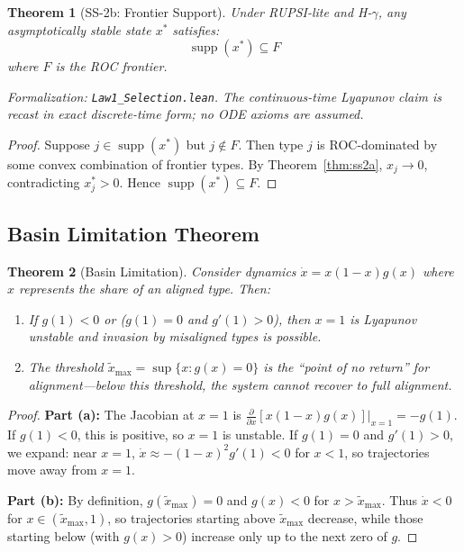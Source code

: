 \documentclass[12pt]{article}
\newtheorem{theorem}{Theorem}[section]
\DeclareMathOperator{\supp}{supp}
\begin{document}
\begin{theorem}[SS-2b: Frontier Support]
\label{thm:ss2b}
Under RUPSI-lite and H-$\gamma$, any asymptotically stable state $x^*$ satisfies:
\[
\supp(x^*) \subseteq F
\]
where $F$ is the ROC frontier.
\end{theorem}
\noindent\textit{Formalization: \texttt{Law1\_Selection.lean}. The continuous-time Lyapunov claim is recast in exact discrete-time form; no ODE axioms are assumed.}

\begin{proof}
Suppose $j \in \supp(x^*)$ but $j \notin F$. Then type $j$ is ROC-dominated by some convex combination of frontier types. By Theorem~\ref{thm:ss2a}, $x_j \to 0$, contradicting $x^*_j > 0$. Hence $\supp(x^*) \subseteq F$.
\end{proof}

\subsection{Basin Limitation Theorem}

\begin{theorem}[Basin Limitation]
\label{thm:basin}
Consider dynamics $\dot{x} = x(1-x)g(x)$ where $x$ represents the share of an aligned type. Then:
\begin{enumerate}
    \item[(a)] If $g(1) < 0$ or ($g(1) = 0$ and $g'(1) > 0$), then $x = 1$ is Lyapunov unstable and invasion by misaligned types is possible.
    
    \item[(b)] The threshold $\tilde{x}_{\max} = \sup\{x : g(x) = 0\}$ is the ``point of no return'' for alignment---below this threshold, the system cannot recover to full alignment.
\end{enumerate}
\end{theorem}

\begin{proof}
\textbf{Part (a):} The Jacobian at $x = 1$ is $\frac{\partial}{\partial x}[x(1-x)g(x)]|_{x=1} = -g(1)$. If $g(1) < 0$, this is positive, so $x = 1$ is unstable. If $g(1) = 0$ and $g'(1) > 0$, we expand: near $x = 1$, $\dot{x} \approx -(1-x)^2 g'(1) < 0$ for $x < 1$, so trajectories move away from $x = 1$.

\textbf{Part (b):} By definition, $g(\tilde{x}_{\max}) = 0$ and $g(x) < 0$ for $x > \tilde{x}_{\max}$. Thus $\dot{x} < 0$ for $x \in (\tilde{x}_{\max}, 1)$, so trajectories starting above $\tilde{x}_{\max}$ decrease, while those starting below (with $g(x) > 0$) increase only up to the next zero of $g$.
\end{proof}
\end{document}
